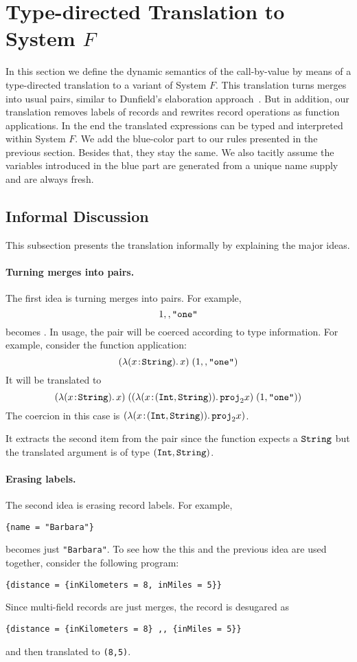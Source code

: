 \section{Type-directed Translation to System $ F $}

In this section we define the dynamic semantics of the call-by-value \name by
means of a type-directed translation to a variant of System $F$. This
translation turns merges into usual pairs, similar to Dunfield's elaboration
approach~\cite{dunfield2014elaborating}. But in addition, our translation
removes labels of records and rewrites record operations as function
applications. In the end the translated expressions can be typed and interpreted
within System $F$. We add the blue-color part to our rules presented in the
previous section. Besides that, they stay the same. We also tacitly assume the
variables introduced in the blue part are generated from a unique name supply and
are always fresh.

\subsection{Informal Discussion}

This subsection presents the translation informally by explaining the major
ideas.

\paragraph{Turning merges into pairs.}
The first idea is turning merges into pairs. For example,
\[
1 ,, \texttt {"one"}
\]
becomes  {}.
In usage, the pair will be coerced according to type information. For example,
consider the function application:
\[
(\lambda (x \!:\! \texttt {String}).\, x) \; (1 ,, \texttt {"one"})
\]
It will be translated to
\[
(\lambda (x \!:\! \texttt {String}).\, x) \; ((\lambda (x \!:\! (\texttt {Int}, \texttt {String})).\, {\texttt {proj}}_{2} x) \; (1, \texttt {"one"}))
\]
The coercion in this case is $(\lambda (x \!:\! (\texttt {Int}, \texttt {String})).\, {\texttt {proj}}_{2} x)$.

\noindent It extracts the second item from the pair since the function expects a $\texttt {String}$
but the translated argument is of type $(\texttt {Int}, \texttt {String})$.

\paragraph{Erasing labels.}
The second idea is erasing record labels. For example,
\begin{lstlisting}
{name = "Barbara"}
\end{lstlisting}
becomes just \lstinline{"Barbara"}.
To see how the this and the previous idea are used together, consider the following program:
\begin{lstlisting}
{distance = {inKilometers = 8, inMiles = 5}}
\end{lstlisting}
Since multi-field records are just merges, the record is desugared as
\begin{lstlisting}
{distance = {inKilometers = 8} ,, {inMiles = 5}}
\end{lstlisting}
and then translated to \lstinline{(8,5)}.

